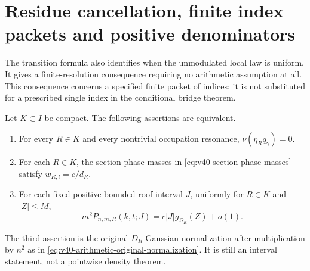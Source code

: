 \section{Residue cancellation, finite index packets and positive denominators}
\label{sec:v41-residue-filters}
The transition formula also identifies when the unmodulated local law
is uniform. It gives a finite-resolution consequence requiring no
arithmetic assumption at all. This consequence concerns a specified
finite packet of indices; it is not substituted for a prescribed single
index in the conditional bridge theorem.

\begin{theorem}
\label{thm:v41-zero-residue-criterion}
Let $K\subset I$ be compact. The following assertions are equivalent.
\begin{enumerate}
\item For every $R\in K$ and every nontrivial occupation resonance,
      $\nu(\eta_Rq_\gamma)=0$.
\item For each $R\in K$, the section phase masses in
      \eqref{eq:v40-section-phase-masses} satisfy $w_{R,l}=c/d_R$.
\item For each fixed positive bounded roof interval $J$, uniformly for
      $R\in K$ and $|Z|\le M$,
\begin{equation}\label{eq:v41-unmodulated-criterion}
 m^2P_{n,m,R}(k,t;J)=c|J|g_{\Omega_R}(Z)+o(1).
\end{equation}
\end{enumerate}
The third assertion is the original $D_R$ Gaussian normalization after
multiplication by $n^2$ as in
\eqref{eq:v40-arithmetic-original-normalization}. It is still an
interval statement, not a pointwise density theorem.
\end{theorem}
